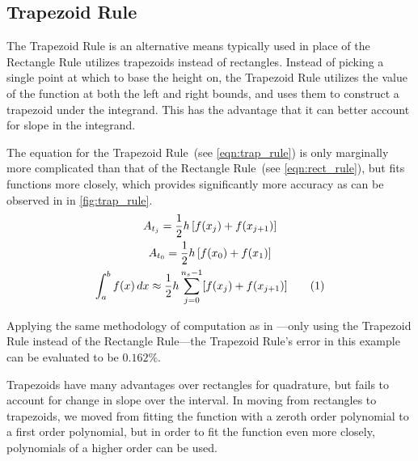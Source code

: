 \documentclass{paper}
\begin{document}
\subsection{Trapezoid Rule}
\label{sec:trap_rule}
The Trapezoid Rule is an alternative means typically used in place of the Rectangle Rule utilizes trapezoids instead of rectangles.
Instead of picking a single point at which to base the height on, the Trapezoid Rule utilizes the value of the function at both the left and right bounds, and uses them to construct a trapezoid under the integrand.
This has the advantage that it can better account for slope in the integrand.\autocite{num_methods}

The equation for the Trapezoid Rule~(see \cref{eqn:trap_rule}) is only marginally more complicated than that of the Rectangle Rule~(see \cref{eqn:rect_rule}), but fits functions more closely, which provides significantly more accuracy as can be observed in in \cref{fig:trap_rule}.
%
\begin{gather*}
    A_{t_{j}} = \frac{1}{2} h \left[ f(x_{j}) + f(x_{j+1}) \right]                                                                                                \\
    A_{t_{0}} = \frac{1}{2} h \left[f(x_0) + f(x_1)\right]                                                                  \\
    \int_a^b f(x) \,dx \approx \frac{1}{2}h \sum^{n_s-1}_{j=0}[f(x_{j}) + f(x_{j+1})] \tageq\label{eqn:trap_rule} 
\end{gather*}
%

%
Applying the same methodology of computation as in ---only using the Trapezoid Rule instead of the Rectangle Rule---the Trapezoid Rule's error in this example can be evaluated to be \(0.162\%\).

Trapezoids have many advantages over rectangles for quadrature, but fails to account for change in slope over the interval.
In moving from rectangles to trapezoids, we moved from fitting the function with a zeroth order polynomial to a first order polynomial, but in order to fit the function even more closely, polynomials of a higher order can be used.
%
\end{document}
